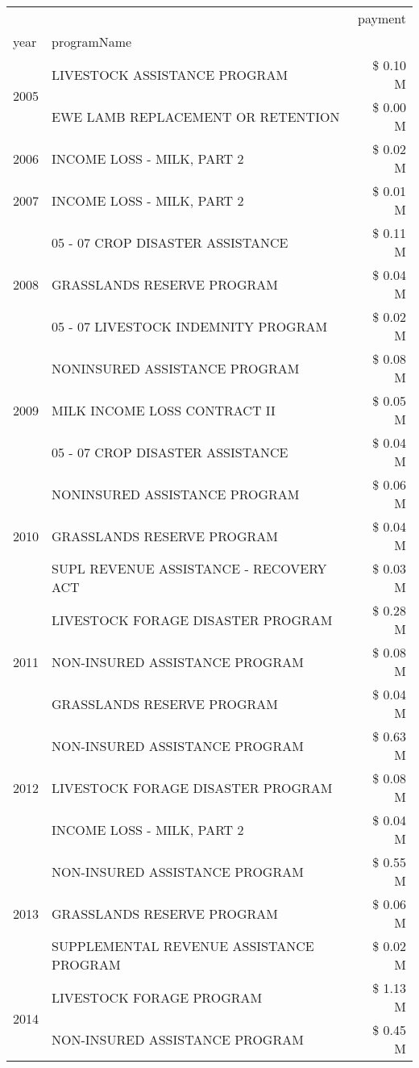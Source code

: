 \begin{tabular}{llr}
\toprule
 &  & payment \\
year & programName &  \\
\midrule
\multirow[t]{2}{*}{2005} & LIVESTOCK ASSISTANCE PROGRAM & \$ 0.10 M \\
 & EWE LAMB REPLACEMENT OR RETENTION & \$ 0.00 M \\
\cline{1-3}
2006 & INCOME LOSS - MILK, PART 2 & \$ 0.02 M \\
\cline{1-3}
2007 & INCOME LOSS - MILK, PART 2 & \$ 0.01 M \\
\cline{1-3}
\multirow[t]{3}{*}{2008} & 05 - 07 CROP DISASTER ASSISTANCE & \$ 0.11 M \\
 & GRASSLANDS RESERVE PROGRAM & \$ 0.04 M \\
 & 05 - 07 LIVESTOCK INDEMNITY PROGRAM & \$ 0.02 M \\
\cline{1-3}
\multirow[t]{3}{*}{2009} & NONINSURED ASSISTANCE PROGRAM & \$ 0.08 M \\
 & MILK INCOME LOSS CONTRACT II & \$ 0.05 M \\
 & 05 - 07 CROP DISASTER ASSISTANCE & \$ 0.04 M \\
\cline{1-3}
\multirow[t]{3}{*}{2010} & NONINSURED ASSISTANCE PROGRAM & \$ 0.06 M \\
 & GRASSLANDS RESERVE PROGRAM & \$ 0.04 M \\
 & SUPL REVENUE ASSISTANCE - RECOVERY ACT & \$ 0.03 M \\
\cline{1-3}
\multirow[t]{3}{*}{2011} & LIVESTOCK FORAGE DISASTER PROGRAM & \$ 0.28 M \\
 & NON-INSURED ASSISTANCE PROGRAM & \$ 0.08 M \\
 & GRASSLANDS RESERVE PROGRAM & \$ 0.04 M \\
\cline{1-3}
\multirow[t]{3}{*}{2012} & NON-INSURED ASSISTANCE PROGRAM & \$ 0.63 M \\
 & LIVESTOCK FORAGE DISASTER PROGRAM & \$ 0.08 M \\
 & INCOME LOSS - MILK, PART 2 & \$ 0.04 M \\
\cline{1-3}
\multirow[t]{3}{*}{2013} & NON-INSURED ASSISTANCE PROGRAM & \$ 0.55 M \\
 & GRASSLANDS RESERVE PROGRAM & \$ 0.06 M \\
 & SUPPLEMENTAL REVENUE ASSISTANCE PROGRAM & \$ 0.02 M \\
\cline{1-3}
\multirow[t]{3}{*}{2014} & LIVESTOCK FORAGE PROGRAM & \$ 1.13 M \\
 & NON-INSURED ASSISTANCE PROGRAM & \$ 0.45 M \\

\end{tabular}
